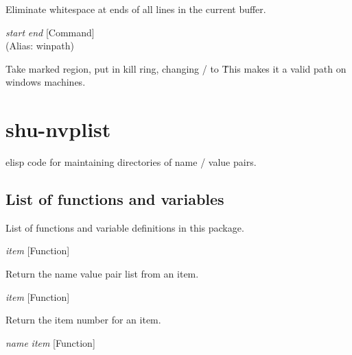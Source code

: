 \begin{doc-string}
Eliminate whitespace at ends of all lines in the current buffer.
\end{doc-string}

\vspace{1em}
\noindent
{}
\usebox{\funcname}\emph{start} \emph{end}
 \hfill [Command]\\%
 (Alias: winpath)

\begin{doc-string}
Take marked region, put in kill ring, changing / to \.
This makes it a valid path on windows machines.
\end{doc-string}

\eject
\section{shu-nvplist}


elisp code for maintaining directories of name / value pairs.


\subsection{List of functions and variables}

List of functions and variable definitions in this package.



\vspace{1em}
\noindent
{}
\usebox{\funcname}\emph{item}
 \hfill [Function]

\begin{doc-string}
Return the name value pair list from an item.
\end{doc-string}

\vspace{1em}
\noindent
{}
\usebox{\funcname}\emph{item}
 \hfill [Function]

\begin{doc-string}
Return the item number for an item.
\end{doc-string}

\vspace{1em}
\noindent
{}
\usebox{\funcname}\emph{name} \emph{item}
 \hfill [Function]

